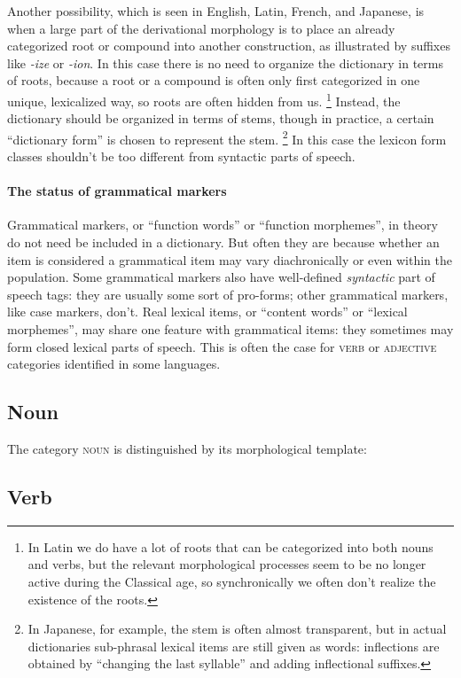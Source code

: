 \documentclass[a4paper, oneside, 12pt]{report}
\newcommand{\form}[1]{\emph{#1}}
\newcommand*{\category}[1]{\textsc{#1}}
\begin{document}
Another possibility, which is seen in English, Latin, French, and Japanese,
is when a large part of the derivational morphology
is to place an already categorized root or compound into another construction,
as illustrated by suffixes like \form{-ize} or \form{-ion}.
In this case there is no need to organize the dictionary in terms of roots,
because a root or a compound is often only first categorized in one unique, lexicalized way,
so roots are often hidden from us.%
\footnote{
    In Latin we do have a lot of roots that can be categorized into both nouns and verbs,
    but the relevant morphological processes seem to be no longer active during the Classical age,
    so synchronically we often don't realize the existence of the roots.
}
Instead, the dictionary should be organized in terms of stems,
though in practice, a certain ``dictionary form'' is chosen to represent the stem.%
\footnote{
    In Japanese, for example, the stem is often almost transparent,
    but in actual dictionaries sub-phrasal lexical items are still given as words:
    inflections are obtained by ``changing the last syllable'' and adding inflectional suffixes.
}
In this case the lexicon form classes shouldn't be too different from syntactic parts of speech.

\paragraph*{The status of grammatical markers}
Grammatical markers, or ``function words'' or ``function morphemes'',
in theory do not need be included in a dictionary.
But often they are because whether an item is considered a grammatical item may vary
diachronically or even within the population.
Some grammatical markers also have well-defined \emph{syntactic} part of speech tags:
they are usually some sort of pro-forms;
other grammatical markers, like case markers, don't.
Real lexical items, or ``content words'' or ``lexical morphemes'',
may share one feature with grammatical items:
they sometimes may form closed lexical parts of speech.
This is often the case for \category{verb} or \category{adjective} categories identified in some languages.

\subsection{Noun}

The category \category{noun} is distinguished by its morphological template:

\subsection{Verb}
\end{document}
